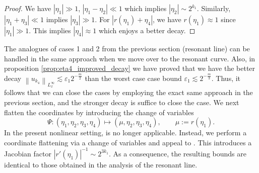 \documentclass[reqno,english,11pt]{amsart}
\newcommand{\eps}{\varepsilon}
\newcommand{\snorm}[1]{\left\|#1\right\|}
\theoremstyle{definition}
\numberwithin{equation}{section}
\begin{document}
\begin{proof}
    We have $|\eta_1|\gg 1$, $|\eta_1-\eta_2|\ll 1$ which implies $|\eta_2|\sim 2^{k_1}$. Similarly, $|\eta_1+\eta_3|\ll 1$ implies $|\eta_3|\gg 1$. For $|r(\eta_1)+\eta_4|$, we have $r(\eta_1)\approx 1$ since $|\eta_1|\gg 1$. This implies $|\eta_4|\approx 1$ which enjoys a better decay.
\end{proof}
\par The analogues of cases 1 and 2 from the  previous section (resonant line) can be handled in the same approach when we move over to the resonant curve. Also, in proposition \ref{prop:eta4_improved_decay} we have proved that we have the better decay $\snorm{u_{k_4}}_{L^{\infty}_{x}} \lesssim \eps_1 2^{-\frac{m}{2}}$ than the worst case case bound $\eps_1 \lesssim 2^{-\frac{m}{3}}$. Thus, it follows that we can close the cases by employing the exact same approach in the previous section, and the stronger decay is suffice to close the case. We next flatten the coordinates by introducing the change of variables
\begin{equation}\label{eq:STR_curve_flat_coordinate}
\Psi:(\eta_1,\eta_2,\eta_3,\eta_4)\mapsto(\mu,\eta_2,\eta_3,\eta_4),
\qquad \mu := r(\eta_1).
\end{equation}
In the present nonlinear setting, \cite[Lemma B.4]{Morgan} is no longer applicable. Instead, we perform a coordinate flattening via a change of variables and appeal to \cite[Remark B.5]{Morgan}. This introduces a Jacobian factor $|r'(\eta_1)|^{-1} \sim 2^{3k_1}$. As a consequence, the resulting bounds are identical to those obtained in the analysis of the resonant line.
\end{document}
